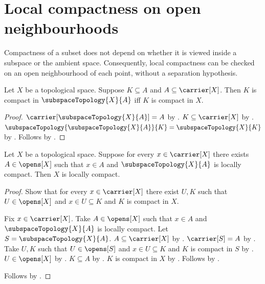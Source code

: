 \section{Local compactness on open neighbourhoods}



Compactness of a subset does not depend on whether it is viewed inside a
subspace or the ambient space. Consequently, local compactness can be checked
on an open neighbourhood of each point, without a separation hypothesis.

\begin{theorem}\label{compact_in_subspace_iff}
    Let $X$ be a topological space.
    Suppose $K\subseteq A$ and $A\subseteq\carrier[X]$.
    Then $K$ is compact in $\subspaceTopology{X}{A}$ iff $K$ is compact in $X$.
\end{theorem}
\begin{proof}
    $\carrier[\subspaceTopology{X}{A}]=A$ by
        .
    $K\subseteq\carrier[X]$ by .
    $\subspaceTopology{\subspaceTopology{X}{A}}{K}=\subspaceTopology{X}{K}$ by
        .
    Follows by .
\end{proof}

\begin{theorem}\label{locally_compact_from_open_neighbourhoods}
    Let $X$ be a topological space.
    Suppose for every $x\in\carrier[X]$ there exists $A\in\opens[X]$ such that
        $x\in A$ and $\subspaceTopology{X}{A}$ is locally compact.
    Then $X$ is locally compact.
\end{theorem}
\begin{proof}
    Show that for every $x\in\carrier[X]$ there exist $U,K$ such that
        $U\in\opens[X]$ and $x\in U\subseteq K$ and $K$ is compact in $X$.
    \begin{subproof}
        Fix $x\in\carrier[X]$.
        Take $A\in\opens[X]$ such that $x\in A$ and
            $\subspaceTopology{X}{A}$ is locally compact.
        Let $S=\subspaceTopology{X}{A}$.
        $A\subseteq\carrier[X]$ by .
        $\carrier[S]=A$ by .
        Take $U,K$ such that $U\in\opens[S]$ and $x\in U\subseteq K$ and
            $K$ is compact in $S$ by .
        $U\in\opens[X]$ by .
        $K\subseteq A$ by .
        $K$ is compact in $X$ by .
        Follows by \auto.
    \end{subproof}
    Follows by .
\end{proof}
